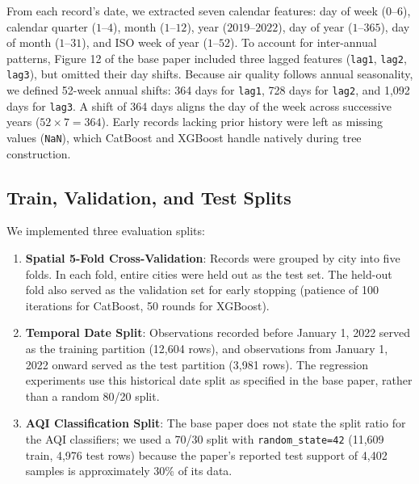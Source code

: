 From each record's date, we extracted seven calendar features: day of week ($0$--$6$), calendar quarter ($1$--$4$), month ($1$--$12$), year ($2019$--$2022$), day of year ($1$--$365$), day of month ($1$--$31$), and ISO week of year ($1$--$52$). To account for inter-annual patterns, Figure 12 of the base paper included three lagged features (\texttt{lag1}, \texttt{lag2}, \texttt{lag3}), but omitted their day shifts. Because air quality follows annual seasonality, we defined 52-week annual shifts: 364 days for \texttt{lag1}, 728 days for \texttt{lag2}, and 1,092 days for \texttt{lag3}. A shift of 364 days aligns the day of the week across successive years ($52 \times 7 = 364$). Early records lacking prior history were left as missing values (\texttt{NaN}), which CatBoost and XGBoost handle natively during tree construction.

\subsection{Train, Validation, and Test Splits}
We implemented three evaluation splits:
\begin{enumerate}
    \item \textbf{Spatial 5-Fold Cross-Validation}: Records were grouped by city into five folds. In each fold, entire cities were held out as the test set. The held-out fold also served as the validation set for early stopping (patience of 100 iterations for CatBoost, 50 rounds for XGBoost).
    \item \textbf{Temporal Date Split}: Observations recorded before January 1, 2022 served as the training partition (12,604 rows), and observations from January 1, 2022 onward served as the test partition (3,981 rows). The regression experiments use this historical date split as specified in the base paper, rather than a random 80/20 split.
    \item \textbf{AQI Classification Split}: The base paper does not state the split ratio for the AQI classifiers; we used a 70/30 split with \texttt{random\_state=42} (11,609 train, 4,976 test rows) because the paper's reported test support of 4,402 samples is approximately 30\% of its data.
\end{enumerate}
